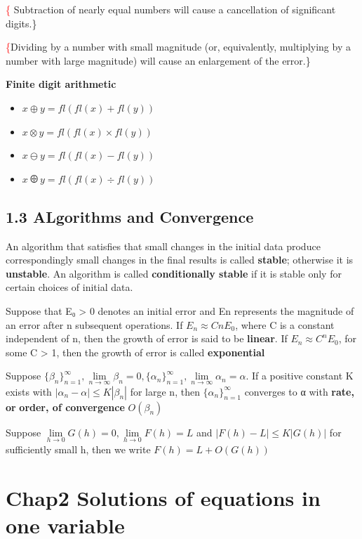 \documentclass[11pt]{article}
\begin{document}
\textcolor{red}\{ Subtraction of nearly equal numbers will
cause a cancellation of significant digits.\} 


\textcolor{red}\{Dividing by a number with small magnitude (or, 
equivalently, multiplying by a number with large magnitude) will 
cause an enlargement of the error.\} 

\textbf{Finite digit arithmetic}

\begin{itemize}
\item \(x\oplus y=fl(fl(x)+fl(y))\)
\item \(x\otimes y=fl(fl(x)\times fl(y))\)
\item \(x\ominus y=fl(fl(x)-fl(y))\)
\item \(x\odiv y=fl(fl(x)\div fl(y))\)
\end{itemize}

\subsection{1.3 ALgorithms and Convergence}
\label{sec:orgbc4035a}
An algorithm that satisfies that small changes in the initial data produce
correspondingly small changes in the final results is called \textbf{stable};
otherwise it is \textbf{unstable}. An algorithm is called \textbf{conditionally stable} if it
is stable only for certain choices of initial data. 

Suppose that E₀ > 0 denotes an initial error and En represents the magnitude
of an error after n subsequent operations. If \(E_n\approx CnE_0\), where C is a
constant independent of n, then the growth of error is said to be \textbf{linear}. If
\(E_n\approx C^nE_0\), for some C > 1, then the growth of error is called \textbf{exponential} 

Suppose \(\{\beta_n\}_{n=1}^\infty, \lim\limits_{n \to \infty}\beta_n=0,
   \{\alpha_n\}_{n=1}^\infty, \lim\limits_{n\to\infty}\alpha_n=\alpha\).
If a positive constant K exists with \(|\alpha_n-\alpha|\le K|\beta_n|\) for
large n, then \(\{\alpha_n\}_{n=1}^\infty\) converges to α with \textbf{rate, or}
\textbf{order, of convergence} \(O(\beta_n)\)

Suppose \(\lim\limits_{h\to 0}G(h)=0, \lim\limits_{h\to 0}F(h)=L\) and
\(|F(h)-L|\le K|G(h)|\) for sufficiently small h, then we write
\(F(h)=L+O(G(h))\)
\section{Chap2 Solutions of equations in one variable}
\label{sec:orga1192f0}
\end{document}
